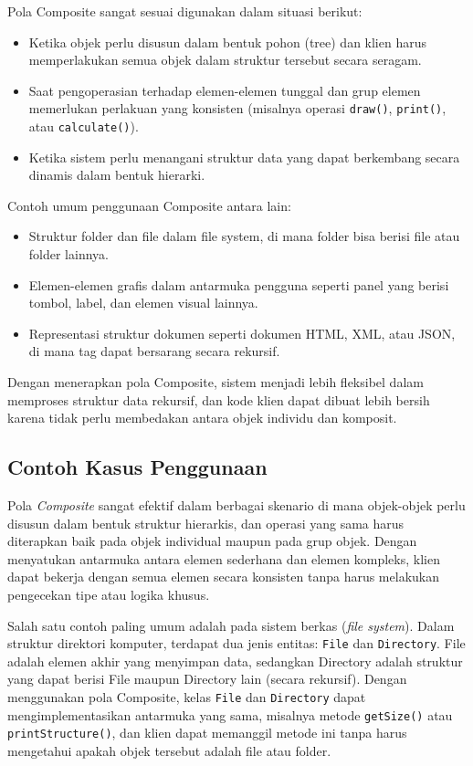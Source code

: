 Pola Composite sangat sesuai digunakan dalam situasi berikut:
\begin{itemize}
	\item Ketika objek perlu disusun dalam bentuk pohon (tree) dan klien harus memperlakukan semua objek dalam struktur tersebut secara seragam.
	\item Saat pengoperasian terhadap elemen-elemen tunggal dan grup elemen memerlukan perlakuan yang konsisten (misalnya operasi \texttt{draw()}, \texttt{print()}, atau \texttt{calculate()}).
	\item Ketika sistem perlu menangani struktur data yang dapat berkembang secara dinamis dalam bentuk hierarki.
\end{itemize}

Contoh umum penggunaan Composite antara lain:
\begin{itemize}
	\item Struktur folder dan file dalam file system, di mana folder bisa berisi file atau folder lainnya.
	\item Elemen-elemen grafis dalam antarmuka pengguna seperti panel yang berisi tombol, label, dan elemen visual lainnya.
	\item Representasi struktur dokumen seperti dokumen HTML, XML, atau JSON, di mana tag dapat bersarang secara rekursif.
\end{itemize}

Dengan menerapkan pola Composite, sistem menjadi lebih fleksibel dalam memproses struktur data rekursif, dan kode klien dapat dibuat lebih bersih karena tidak perlu membedakan antara objek individu dan komposit.

\subsection{Contoh Kasus Penggunaan}

Pola \textit{Composite} sangat efektif dalam berbagai skenario di mana objek-objek perlu disusun dalam bentuk struktur hierarkis, dan operasi yang sama harus diterapkan baik pada objek individual maupun pada grup objek. Dengan menyatukan antarmuka antara elemen sederhana dan elemen kompleks, klien dapat bekerja dengan semua elemen secara konsisten tanpa harus melakukan pengecekan tipe atau logika khusus.

Salah satu contoh paling umum adalah pada sistem berkas (\textit{file system}). Dalam struktur direktori komputer, terdapat dua jenis entitas: \texttt{File} dan \texttt{Directory}. File adalah elemen akhir yang menyimpan data, sedangkan Directory adalah struktur yang dapat berisi File maupun Directory lain (secara rekursif). Dengan menggunakan pola Composite, kelas \texttt{File} dan \texttt{Directory} dapat mengimplementasikan antarmuka yang sama, misalnya metode \texttt{getSize()} atau \texttt{printStructure()}, dan klien dapat memanggil metode ini tanpa harus mengetahui apakah objek tersebut adalah file atau folder.

